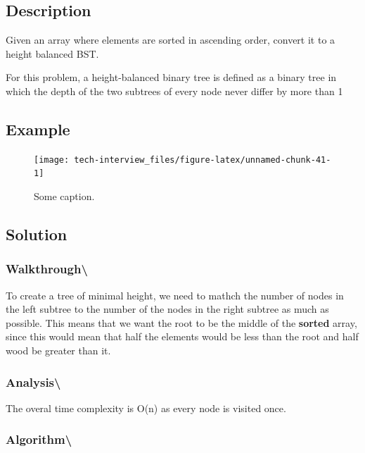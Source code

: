 \documentclass[]{book}
\begin{document}
\hypertarget{description-77}{%
\subsection{Description}\label{description-77}}

Given an array where elements are sorted in ascending order, convert it to a height balanced BST.

For this problem, a height-balanced binary tree is defined as a binary tree in which the depth of the two subtrees of
every node never differ by more than 1

\hypertarget{example-74}{%
\subsection{Example}\label{example-74}}

\begin{figure}
\texttt{[image: tech-interview\_files/figure-latex/unnamed-chunk-41-1]} \caption{Some caption.}\label{fig:unnamed-chunk-41}
\end{figure}

\hypertarget{solution-54}{%
\subsection{Solution}\label{solution-54}}

\hypertarget{walkthrough-88}{%
\subsubsection{Walkthrough\textbackslash{}}\label{walkthrough-88}}

To create a tree of minimal height, we need to mathch the number of nodes in the left subtree to the number of the
nodes in the right subtree as much as possible. This means that we want the root to be the middle of the \textbf{sorted }
array, since this would mean that half the elements would be less than the root and half wood be greater than it.

\hypertarget{analysis-95}{%
\subsubsection{Analysis\textbackslash{}}\label{analysis-95}}

The overal time complexity is O(n) as every node is visited once.

\hypertarget{algorithm-97}{%
\subsubsection{Algorithm\textbackslash{}}\label{algorithm-97}}
\end{document}
